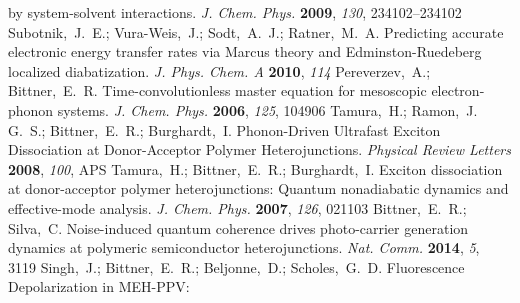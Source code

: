 \begin{mcitethebibliography}{27}
  by system-solvent interactions. \emph{J. Chem. Phys.}
  \textbf{2009}, \emph{130}, 234102--234102\relax
\mciteBstWouldAddEndPuncttrue
\mciteSetBstMidEndSepPunct{\mcitedefaultmidpunct}
{\mcitedefaultendpunct}{\mcitedefaultseppunct}\relax
\EndOfBibitem
{}
Subotnik,~J.~E.; Vura-Weis,~J.; Sodt,~A.~J.; Ratner,~M.~A. Predicting accurate
  electronic energy transfer rates via Marcus theory and Edminston-Ruedeberg
  localized diabatization. \emph{J. Phys. Chem. A} \textbf{2010},
  \emph{114}\relax
\mciteBstWouldAddEndPuncttrue
\mciteSetBstMidEndSepPunct{\mcitedefaultmidpunct}
{\mcitedefaultendpunct}{\mcitedefaultseppunct}\relax
\EndOfBibitem
{}
Pereverzev,~A.; Bittner,~E.~R. Time-convolutionless master equation for
  mesoscopic electron-phonon systems. \emph{J. Chem. Phys.}
  \textbf{2006}, \emph{125}, 104906\relax
\mciteBstWouldAddEndPuncttrue
\mciteSetBstMidEndSepPunct{\mcitedefaultmidpunct}
{\mcitedefaultendpunct}{\mcitedefaultseppunct}\relax
\EndOfBibitem
{}
Tamura,~H.; Ramon,~J. G.~S.; Bittner,~E.~R.; Burghardt,~I. Phonon-Driven
  Ultrafast Exciton Dissociation at Donor-Acceptor Polymer Heterojunctions.
  \emph{Physical Review Letters} \textbf{2008}, \emph{100}, APS\relax
\mciteBstWouldAddEndPuncttrue
\mciteSetBstMidEndSepPunct{\mcitedefaultmidpunct}
{\mcitedefaultendpunct}{\mcitedefaultseppunct}\relax
\EndOfBibitem
{}
Tamura,~H.; Bittner,~E.~R.; Burghardt,~I. Exciton dissociation at
  donor-acceptor polymer heterojunctions: Quantum nonadiabatic dynamics and
  effective-mode analysis. \emph{J. Chem. Phys.}
  \textbf{2007}, \emph{126}, 021103\relax
\mciteBstWouldAddEndPuncttrue
\mciteSetBstMidEndSepPunct{\mcitedefaultmidpunct}
{\mcitedefaultendpunct}{\mcitedefaultseppunct}\relax
\EndOfBibitem
{}
Bittner,~E.~R.; Silva,~C. Noise-induced quantum coherence drives photo-carrier
  generation dynamics at polymeric semiconductor heterojunctions. \emph{Nat.   Comm.} \textbf{2014}, \emph{5}, 3119\relax
\mciteBstWouldAddEndPuncttrue
\mciteSetBstMidEndSepPunct{\mcitedefaultmidpunct}
{\mcitedefaultendpunct}{\mcitedefaultseppunct}\relax
\EndOfBibitem
{}
Singh,~J.; Bittner,~E.~R.; Beljonne,~D.; Scholes,~G.~D. Fluorescence Depolarization in MEH-PPV:

\end{mcitethebibliography}
